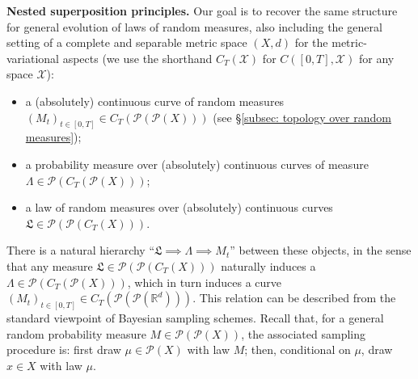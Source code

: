 \documentclass[10pt,leqno]{amsart}
\numberwithin{equation}{section}
\newcommand{\R}{\mathbb{R}}
\newcommand{\PP}{\mathcal{P}}
\begin{document}
\bigskip
\noindent 
\textbf{Nested superposition principles.} 
Our goal is to recover the same structure
for general evolution of 
laws of random measures, 
also including the
general setting of a complete and separable metric space $(X,d)$ for the 
metric-variational aspects 
(we use the shorthand $C_T(\mathcal X)$ for 
$C([0,T],\mathcal X)$ for any space $\mathcal X$):
\begin{itemize}
    \item a (absolutely) continuous curve of random measures $(M_t)_{t\in [0,T]}\in C_T(\PP(\PP(X)))$ (see §\ref{subsec: topology over random measures});
    \item a probability measure over (absolutely) continuous curves of measure $\Lambda \in \PP(C_T(\PP(X)))$;
    \item a 
    law of random measures over 
    (absolutely) continuous curves $\mathfrak{L}\in \PP(\PP(C_T(X)))$.
\end{itemize}
%
There is a natural hierarchy 
``$\mathfrak{L} \implies \Lambda \implies M_t$'' between these objects,
in the sense that any measure $\mathfrak{L}\in \PP(\PP(C_T(X)))$ naturally induces a $\Lambda\in \PP(C_T(\PP(X)))$, which in turn induces a curve $(M_t)_{t\in [0,T]} \in C_T(\PP(\PP(\R^d)))$.
%
This relation can be described from the standard viewpoint of Bayesian sampling schemes. Recall that, for a general random probability measure \(M \in \PP(\PP(X))\), the associated sampling procedure is: first draw \(\mu \in \PP(X)\) with law \(M\); then, conditional on \(\mu\), draw \(x \in X\) with law \(\mu\). 

\end{document}
